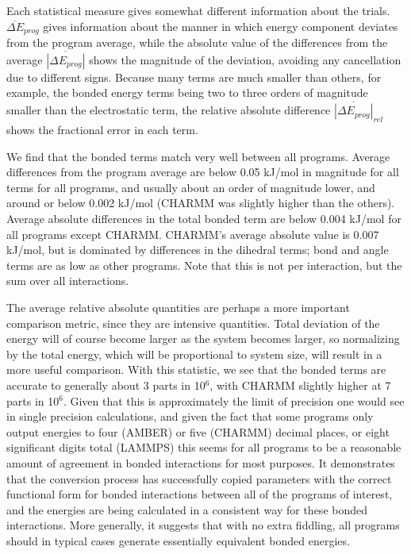 Each statistical measure gives somewhat different information about
the trials. $\overline{\Delta E}_{prog}$ gives information about the manner
in which energy component deviates from the program average, while the
absolute value of the differences from the average $\overline{\left|\Delta E_{prog}\right|}$ 
shows the magnitude of the deviation, avoiding any
cancellation due to different signs.  Because many terms are much
smaller than others, for example, the bonded energy terms being two to
three orders of magnitude smaller than the electrostatic term, the
relative absolute difference $\overline{\left|\Delta E_{prog}\right|}_{rel}$ shows the fractional error in each term.

We find that the bonded terms match very well between all
programs. Average differences from the program average are below 0.05
kJ/mol in magnitude for all terms for all programs, and usually about
an order of magnitude lower, and around or below 0.002 kJ/mol (CHARMM
was slightly higher than the others). Average absolute differences in
the total bonded term are below 0.004 kJ/mol for all programs except
CHARMM. CHARMM's average absolute value is 0.007 kJ/mol, but is
dominated by differences in the dihedral terms; bond and angle terms
are as low as other programs.  Note that this is not per interaction,
but the sum over all interactions.

The average relative absolute quantities are perhaps a more important
comparison metric, since they are intensive quantities.  Total
deviation of the energy will of course become larger as the system
becomes larger, so normalizing by the total energy, which will be
proportional to system size, will result in a more useful comparison.
With this statistic, we see that the bonded terms are accurate to
generally about 3 parts in 10$^{6}$, with CHARMM slightly higher at 7
parts in 10$^{6}$. Given that this is approximately the limit of
precision one would see in single precision calculations, and given
the fact that some programs only output energies to four (AMBER) or
five (CHARMM) decimal places, or eight significant digits total
(LAMMPS) this seems for all programs to be a reasonable amount of
agreement in bonded interactions for most purposes. It demonstrates
that the conversion process has successfully copied parameters with
the correct functional form for bonded interactions between all of the
programs of interest, and the energies are being calculated in a
consistent way for these bonded interactions.  More generally, it
suggests that with no extra fiddling, all programs should in typical
cases generate essentially equivalent bonded energies.


